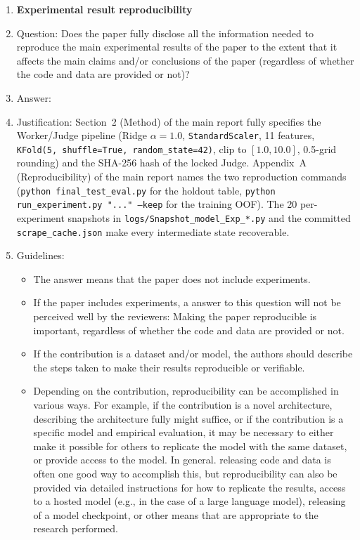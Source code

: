 \documentclass{article}
\begin{document}
\begin{enumerate}
    \item {\bf Experimental result reproducibility}
    \item[] Question: Does the paper fully disclose all the information needed to reproduce the main experimental results of the paper to the extent that it affects the main claims and/or conclusions of the paper (regardless of whether the code and data are provided or not)?
    \item[] Answer: \answerYes{}
    \item[] Justification: Section~2 (Method) of the main report fully specifies the Worker/Judge pipeline (Ridge $\alpha{=}1.0$, \texttt{StandardScaler}, 11 features, \texttt{KFold(5, shuffle=True, random\_state=42)}, clip to $[1.0,10.0]$, 0.5-grid rounding) and the SHA-256 hash of the locked Judge. Appendix~A (Reproducibility) of the main report names the two reproduction commands (\texttt{python final\_test\_eval.py} for the holdout table, \texttt{python run\_experiment.py "..." --keep} for the training OOF). The 20 per-experiment snapshots in \texttt{logs/Snapshot\_model\_Exp\_*.py} and the committed \texttt{scrape\_cache.json} make every intermediate state recoverable.
    \item[] Guidelines:
    \begin{itemize}
        \item The answer \answerNA{} means that the paper does not include experiments.
        \item If the paper includes experiments, a \answerNo{} answer to this question will not be perceived well by the reviewers: Making the paper reproducible is important, regardless of whether the code and data are provided or not.
        \item If the contribution is a dataset and\slash or model, the authors should describe the steps taken to make their results reproducible or verifiable.
        \item Depending on the contribution, reproducibility can be accomplished in various ways. For example, if the contribution is a novel architecture, describing the architecture fully might suffice, or if the contribution is a specific model and empirical evaluation, it may be necessary to either make it possible for others to replicate the model with the same dataset, or provide access to the model. In general. releasing code and data is often one good way to accomplish this, but reproducibility can also be provided via detailed instructions for how to replicate the results, access to a hosted model (e.g., in the case of a large language model), releasing of a model checkpoint, or other means that are appropriate to the research performed.

\end{itemize}
\end{enumerate}
\end{document}
